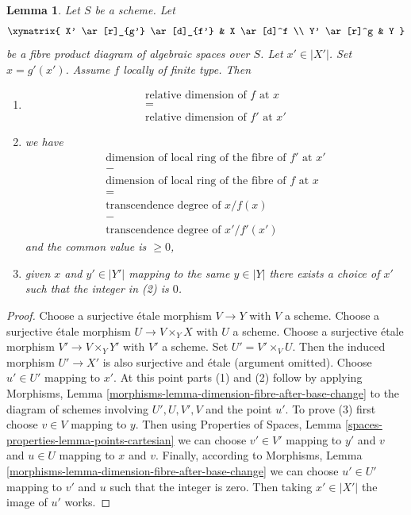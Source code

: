 \documentclass{stacks-project}
\theoremstyle{plain}
\newtheorem{lemma}[subsection]{Lemma}
\theoremstyle{definition}
\theoremstyle{remark}
\numberwithin{equation}{subsection}
\begin{document}
\begin{lemma}
\label{lemma-dimension-fibre-after-base-change}
Let $S$ be a scheme. Let
$$
\xymatrix{
X' \ar[r]_{g'} \ar[d]_{f'} & X \ar[d]^f \\
Y' \ar[r]^g & Y
}
$$
be a fibre product diagram of algebraic spaces over $S$.
Let $x' \in |X'|$. Set $x = g'(x')$. Assume $f$ locally of finite type.
Then
\begin{enumerate}
\item
$$
\begin{matrix}
\text{relative dimension of }f\text{ at }x \\
= \\
\text{relative dimension of }f'\text{ at }x'
\end{matrix}
$$
\item we have
$$
\begin{matrix}
\text{dimension of local ring of the fibre of }f'\text{ at }x' \\
- \\
\text{dimension of local ring of the fibre of }f\text{ at }x \\
= \\
\text{transcendence degree of }x/f(x) \\
- \\
\text{transcendence degree of }x'/f'(x')
\end{matrix}
$$
and the common value is $\geq 0$,
\item given $x$ and $y' \in |Y'|$ mapping to the same $y \in |Y|$
there exists a choice of $x'$ such that the integer in (2) is $0$.
\end{enumerate}
\end{lemma}

\begin{proof}
Choose a surjective \'etale morphism $V \to Y$ with $V$ a scheme.
Choose a surjective \'etale morphism $U \to V \times_Y X$ with $U$ a scheme.
Choose a surjective \'etale morphism $V' \to V \times_Y Y'$ with $V'$ a scheme.
Set $U' = V' \times_V U$.
Then the induced morphism $U' \to X'$ is also surjective and
\'etale (argument omitted). Choose $u' \in U'$
mapping to $x'$. At this point parts (1) and (2) follow by applying
Morphisms, Lemma \ref{morphisms-lemma-dimension-fibre-after-base-change}
to the diagram of schemes involving $U', U, V', V$ and the point $u'$.
To prove (3) first choose $v \in V$ mapping to $y$.
Then using Properties of Spaces, Lemma
\ref{spaces-properties-lemma-points-cartesian}
we can choose $v' \in V'$ mapping to $y'$ and $v$ and
$u \in U$ mapping to $x$ and $v$. Finally, according to
Morphisms, Lemma \ref{morphisms-lemma-dimension-fibre-after-base-change}
we can choose $u' \in U'$ mapping to $v'$ and $u$ such that
the integer is zero. Then taking $x' \in |X'|$ the image of $u'$ works.
\end{proof}
\end{document}
